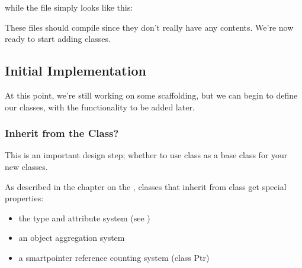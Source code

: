 \documentclass[letterpaper,10pt,english]{sphinxmanual}
\renewcommand{\sphinxcode}[1]{\texttt{\small{#1}}}
\begin{document}
while the \sphinxcode{} file simply looks like this:

\begin{sphinxVerbatim}[commandchars=\\\{\}]
 

  

 
\end{sphinxVerbatim}

These files should compile since they don’t really have any contents.  We’re now
ready to start adding classes.


\subsection{Initial Implementation}
\label{\detokenize{new-models:initial-implementation}}
At this point, we’re still working on some scaffolding, but we can begin to
define our classes, with the functionality to be added later.


\subsubsection{Inherit from the  Class?}
\label{\detokenize{new-models:inherit-from-the-object-class}}
This is an important design step; whether to use class \sphinxcode{} as a
base class for your new classes.

As described in the chapter on the  {\hyperref[\detokenize{object-model:object-model}]{}}, classes that
inherit from class \sphinxcode{} get special properties:
\begin{itemize}
\item {} 
the  type and attribute system (see {\hyperref[\detokenize{attributes:attributes}]{}})

\item {} 
an object aggregation system

\item {} 
a smart\sphinxhyphen{}pointer reference counting system (class Ptr)

\end{itemize}
\end{document}
